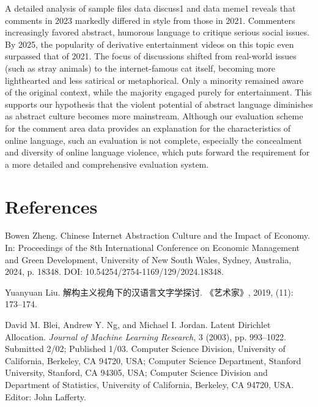 \documentclass[12pt,a4paper]{ctexart}
\begin{document}
A detailed analysis of sample files data discuss1 and data meme1 reveals that comments in 2023 markedly differed in style from those in 2021. Commenters increasingly favored abstract, humorous language to critique serious social issues. By 2025, the popularity of derivative entertainment videos on this topic even surpassed that of 2021. The focus of discussions shifted from real-world issues (such as stray animals) to the internet-famous cat itself, becoming more lighthearted and less satirical or metaphorical. Only a minority remained aware of the original context, while the majority engaged purely for entertainment. This supports our hypothesis that the violent potential of abstract language diminishes as abstract culture becomes more mainstream. Although our evaluation scheme for the comment area data provides an explanation for the characteristics of online language, such an evaluation is not complete, especially the concealment and diversity of online language violence, which puts forward the requirement for a more detailed and comprehensive evaluation system.
\newpage

\section{References}

\begin{thebibliography}{99} %

Bowen Zheng.
\newblock Chinese Internet Abstraction Culture and the Impact of Economy.
\newblock In: Proceedings of the 8th International Conference on Economic Management and Green Development, University of New South Wales, Sydney, Australia, 2024, p. 18348.
\newblock DOI: 10.54254/2754-1169/129/2024.18348.

Yuanyuan Liu.
\newblock 解构主义视角下的汉语言文字学探讨.
\newblock 《艺术家》, 2019, (11): 173--174.

David M. Blei, Andrew Y. Ng, and Michael I. Jordan.
\newblock Latent Dirichlet Allocation.
\newblock \textit{Journal of Machine Learning Research}, 3 (2003), pp. 993--1022.
\newblock Submitted 2/02; Published 1/03.
\newblock Computer Science Division, University of California, Berkeley, CA 94720, USA; Computer Science Department, Stanford University, Stanford, CA 94305, USA; Computer Science Division and Department of Statistics, University of California, Berkeley, CA 94720, USA.
\newblock Editor: John Lafferty.

\end{thebibliography}
\end{document}

